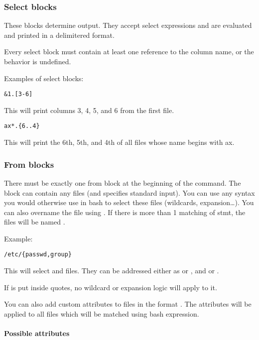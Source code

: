 \subsubsection{Select blocks}
These blocks determine output. They accept select expressions and are evaluated and printed in a delimitered format.

Every select block must contain at least one reference to the column name, or the behavior is undefined.

Examples of select blocks:
\begin{verbatim}
&1.[3-6]
\end{verbatim}
This will print columns 3, 4, 5, and 6 from the first file.

\begin{verbatim}
ax*.{6..4}
\end{verbatim}
This will print the 6th, 5th, and 4th of all files whose name begins with ax.

\subsubsection{From blocks}
There must be exactly one from block at the beginning of the command. 
The block can contain any files (and \icode{-} specifies standard input). 
You can use any syntax you would otherwise use in bash to select these files (wildcards, expansion\ldots)\break\cite{bash-reference-manual}. 
You can also overname the file using . If there is more than 1 matching of stmt, the files will be named .

Example:
\begin{verbatim}
/etc/{passwd,group}
\end{verbatim}

This will select  and  files. They can be addressed either as  or , and  or .

If  is put inside  quotes, no wildcard or expansion logic will apply to it.

You can also add custom attributes to files in the format \break {}. The attributes will be applied to all files which will be matched using  bash expression.

\paragraph{Possible attributes}

